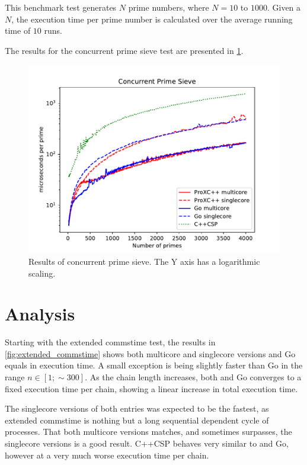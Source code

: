 This benchmark test generates $N$ prime numbers, where $N=10$ to $1000$. Given a $N$, the execution time per prime number is calculated over the average running time of $10$ runs.

The results for the concurrent prime sieve test are presented in \cref{fig:concurrent_sieve}.

\begin{figure}[h!]
    \centering
    \includegraphics[width=0.9\linewidth]{fig/concurrent_sieve}
    \caption{Results of concurrent prime sieve. The Y axis has a logarithmic scaling.}
    \label{fig:concurrent_sieve}
\end{figure}


\FloatBarrier
\section{Analysis}
\label{sec:analysis}


Starting with the extended commstime test, the results in \cref{fig:extended_commstime} shows both multicore and singlecore versions \Proxc{} and Go equals in execution time. A small exception is \Proxc{} being slightly faster than Go in the range $n\in[1;\sim{}300]$. As the chain length increases, both \Proxc{} and Go converges to a fixed execution time per chain, showing a linear increase in total execution time. 

The singlecore versions of both entries was expected to be the fastest, as extended commstime is nothing but a long sequential dependent cycle of processes. That both multicore versions matches, and sometimes surpasses, the singlecore versions is a good result. C++CSP behaves very similar to \Proxc{} and Go, however at a very much worse execution time per chain. 

